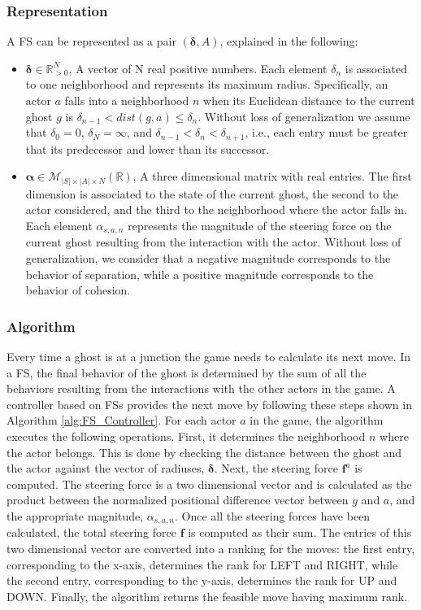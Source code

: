 \documentclass[journal]{IEEEtran}
\begin{document}
\subsubsection{Representation}
A FS can be represented as a pair $(\boldsymbol\delta, A)$, explained in the following:
\begin{itemize}
  \item $\boldsymbol\delta \in \mathbb{R}_{>0}^N$, A vector of N real positive numbers. Each element $\delta_n$ is associated to one neighborhood and represents its maximum radius. Specifically, an actor $a$ falls into a neighborhood $n$ when its Euclidean distance to the current ghost $g$ is $\delta_{n-1} < dist(g,a) \leq \delta_n$. Without loss of generalization we assume that $\delta_0 = 0$, $\delta_N = \infty$, and $\delta_{n-1} < \delta_n < \delta_{n+1}$, i.e., each entry must be greater that its predecessor and lower than its successor.
  \item $\boldsymbol\alpha \in \mathcal{M}_{|S| \times |A| \times N}(\mathbb{R})$, A three dimensional matrix with real entries. The first dimension is associated to the state of the current ghost, the second to the actor considered, and the third to the neighborhood where the actor falls in. Each element $\alpha_{s,a,n}$ represents the magnitude of the steering force on the current ghost resulting from the interaction with the actor. Without loss of generalization, we consider that a negative magnitude corresponds to the behavior of separation, while a positive magnitude corresponds to the behavior of cohesion.
\end{itemize}

\subsubsection{Algorithm}
Every time a ghost is at a junction the game needs to calculate its next move. In a FS, the final behavior of the ghost is determined by the sum of all the behaviors resulting from the interactions with the other actors in the game. A controller based on FSs provides the next move by following these steps shown in Algorithm \ref{alg:FS_Controller}. For each actor $a$ in the game, the algorithm executes the following operations. First, it determines the neighborhood $n$ where the actor belongs. This is done by checking the distance between the ghost and the actor against the vector of radiuses, $\boldsymbol\delta$. Next, the steering force $\mathbf{f}^a$ is computed. The steering force is a two dimensional vector and is calculated as the product between the normalized positional difference vector between $g$ and $a$, and the appropriate magnitude, $\alpha_{s,a,n}$. Once all the steering forces have been calculated, the total steering force $\mathbf{f}$ is computed as their sum. The entries of this two dimensional vector are converted into a ranking for the moves: the first entry, corresponding to the x-axis, determines the rank for LEFT and RIGHT, while the second entry, corresponding to the y-axis, determines the rank for UP and DOWN. Finally, the algorithm returns the feasible move having maximum rank.
\end{document}

